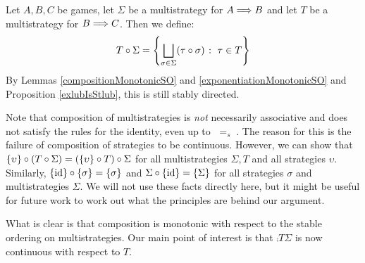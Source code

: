 \documentclass{entcs} \usepackage{prentcsmacro}
\newcommand{\steq}{{\;=_s\;}}
\newcommand{\exlub}{\bigsqcup}
\newcommand{\0}{{\mathtt{0}}}
\newcommand{\Tau}{T}
\begin{document}
\begin{definition}
  Let $A,B,C$ be games, let $\Sigma$ be a multistrategy for $A\Longrightarrow B$ and let $\Tau$ be a multistrategy for $B\Longrightarrow C$.  Then we define:
  \[
    \icomp\Tau\Sigma = \left\{\exlub_{\sigma\in\Sigma}(\icomp\tau\sigma)\suchthat\tau\in\Tau\right\}
    \]
  By Lemmas \ref{compositionMonotonicSO} and \ref{exponentiationMonotonicSO} and Proposition \ref{exlubIsStlub}, this is still stably directed.
\end{definition}

Note that composition of multistrategies is \emph{not} necessarily associative and does not satisfy the rules for the identity, even up to $\steq$.  The reason for this is the failure of composition of strategies to be continuous.  However, we can show that $\icomp{\{\upsilon\}}{(\icomp\Tau\Sigma)}=\icomp{(\icomp{\{\upsilon\}}\Tau)}\Sigma$ for all multistrategies $\Sigma,\Tau$ and all strategies $\upsilon$.  Similarly, $\{\operatorname{id}\} \circ \{\sigma\}=\{\sigma\}$ and $\Sigma \circ \{\operatorname{id}\}=\{\Sigma\}$ for all strategies $\sigma$ and multistrategies $\Sigma$.  We will not use these facts directly here, but it might be useful for future work to work out what the principles are behind our argument.

What is clear is that composition is monotonic with respect to the stable ordering on multistrategies.  Our main point of interest is that $\comp\Tau\Sigma$ is now continuous with respect to $\Tau$.
\end{document}
